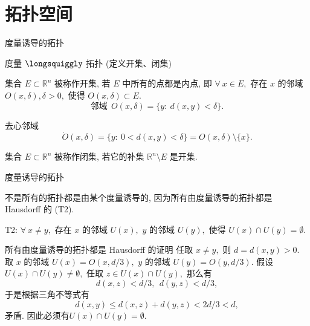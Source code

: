 
\section{拓扑空间}


\begin{frame}{度量诱导的拓扑}

度量 $\longsquiggly$ 拓扑 \quad (定义开集、闭集)

\pause

\begin{Def}[开集]
集合 $E \subset \mathbb{R}^n$ 被称作开集, 若 $E$ 中所有的点都是{\color{red}内点}, 即 $\forall~x \in E,$ {\color{red} 存在 $x$ 的邻域 $O(x, \delta), \delta > 0,$ 使得 $O(x, \delta) \subset E.$}
\[\text{邻域} ~~ O(x, \delta) = \{ y: ~ d(x, y) < \delta \}.\]
\end{Def}

\pause
\vspace{1em}

去心邻域
\[\mathring{O}(x, \delta) = \{ y: ~ 0 < d(x, y) < \delta \} = O(x, \delta) \setminus \{x\}.\]

\pause
\vspace{1em}

\begin{Def}[闭集]
集合 $E \subset \mathbb{R}^n$ 被称作闭集, 若它的补集 $\mathbb{R}^n \setminus E$ 是开集.
\end{Def}

\end{frame}


\begin{frame}{度量诱导的拓扑}

不是所有的拓扑都是由某个度量诱导的, 因为所有由度量诱导的拓扑都是 Hausdorff 的 (T2).

\pause
\vspace{1em}

T2: $\forall~x \neq y,$ 存在 $x$ 的邻域 $U(x),$ $y$ 的邻域 $U(y),$ 使得 $U(x) \cap U(y) = \emptyset.$

\pause
\vspace{1em}

\begin{block}{所有由度量诱导的拓扑都是 Hausdorff 的证明}
任取 $x \neq y,$ 则 $d = d(x, y) > 0.$ 取 $x$ 的邻域 $U(x) = O(x, d/3),$ $y$ 的邻域 $U(y) = O(y, d/3).$ 假设 $U(x) \cap U(y) \neq \emptyset,$ 任取 $z \in U(x) \cap U(y),$ 那么有
\[d(x, z) < d/3, ~~ d(y, z) < d/3,\]
于是根据三角不等式有
\[d(x, y) \leqslant d(x, z) + d(y, z) < 2d/3 < d,\]
矛盾. 因此必须有$U(x) \cap U(y) = \emptyset.$
\end{block}

\end{frame}

